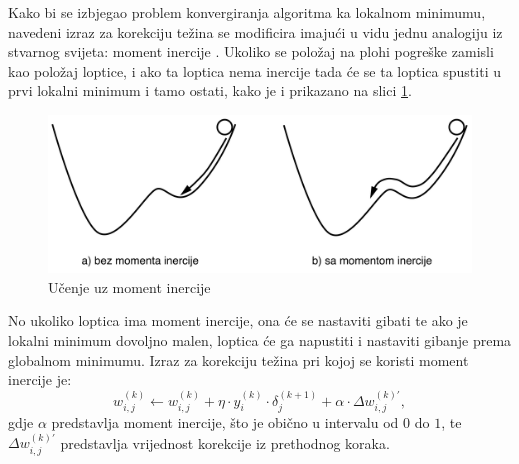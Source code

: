  Kako bi se izbjegao problem konvergiranja algoritma ka lokalnom minimumu, navedeni izraz za korekciju težina se modificira imajući u vidu jednu analogiju iz stvarnog svijeta: moment inercije \citep{umjnm}. Ukoliko se položaj na plohi pogreške zamisli kao položaj loptice, i ako ta loptica nema inercije tada će se ta loptica spustiti u prvi lokalni minimum i tamo ostati, kako je i prikazano na slici \ref{fig:momentum}.
 \begin{figure}[htb]
    \centering
    \includegraphics[width=14cm]{images/momentum.pdf}
    \caption{Učenje uz moment inercije}
    \label{fig:momentum}
\end{figure}

No ukoliko loptica ima moment inercije, ona će se nastaviti gibati te ako je lokalni minimum dovoljno malen, loptica će ga napustiti i nastaviti gibanje prema globalnom minimumu. Izraz za korekciju težina pri kojoj se koristi moment inercije je:$$w_{i,j}^{(k)} \leftarrow w_{i,j}^{(k)} + \eta\cdot y_i ^ {(k)}\cdot \delta_j^{(k+1)} + \alpha\cdot\Delta w_{i,j}^{(k)'},$$ gdje $\alpha$ predstavlja moment inercije, što je obično u intervalu od $0$ do $1$, te $\Delta w_{i,j}^{(k)'}$ predstavlja vrijednost korekcije iz prethodnog koraka.

